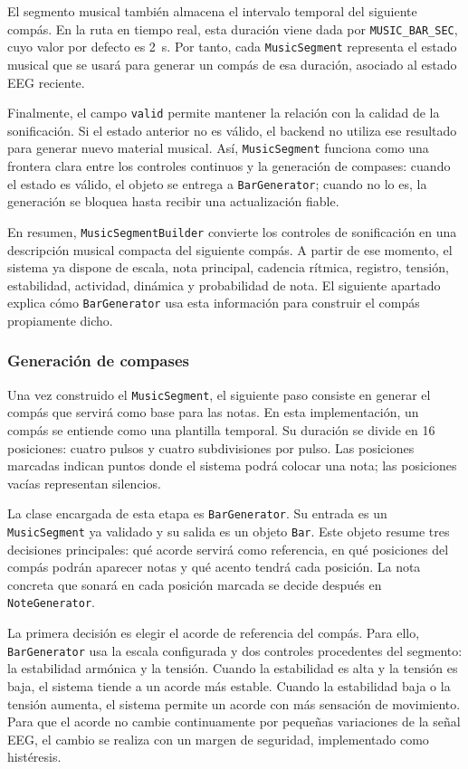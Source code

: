 \documentclass[../main.tex]{subfiles}
\begin{document}
El segmento musical también almacena el intervalo temporal del siguiente compás. En la ruta en tiempo real, esta duración viene dada por \texttt{MUSIC\_BAR\_SEC}, cuyo valor por defecto es \SI{2}{\second}. Por tanto, cada \texttt{MusicSegment} representa el estado musical que se usará para generar un compás de esa duración, asociado al estado EEG reciente.

Finalmente, el campo \texttt{valid} permite mantener la relación con la calidad de la sonificación. Si el estado anterior no es válido, el backend no utiliza ese resultado para generar nuevo material musical. Así, \texttt{MusicSegment} funciona como una frontera clara entre los controles continuos y la generación de compases: cuando el estado es válido, el objeto se entrega a \texttt{BarGenerator}; cuando no lo es, la generación se bloquea hasta recibir una actualización fiable.

En resumen, \texttt{MusicSegmentBuilder} convierte los controles de sonificación en una descripción musical compacta del siguiente compás. A partir de ese momento, el sistema ya dispone de escala, nota principal, cadencia rítmica, registro, tensión, estabilidad, actividad, dinámica y probabilidad de nota. El siguiente apartado explica cómo \texttt{BarGenerator} usa esta información para construir el compás propiamente dicho.

\subsubsection{Generación de compases}

Una vez construido el \texttt{MusicSegment}, el siguiente paso consiste en generar el compás que servirá como base para las notas. En esta implementación, un compás se entiende como una plantilla temporal. Su duración se divide en 16 posiciones: cuatro pulsos y cuatro subdivisiones por pulso. Las posiciones marcadas indican puntos donde el sistema podrá colocar una nota; las posiciones vacías representan silencios.

La clase encargada de esta etapa es \texttt{BarGenerator}. Su entrada es un \texttt{MusicSegment} ya validado y su salida es un objeto \texttt{Bar}. Este objeto resume tres decisiones principales: qué acorde servirá como referencia, en qué posiciones del compás podrán aparecer notas y qué acento tendrá cada posición. La nota concreta que sonará en cada posición marcada se decide después en \texttt{NoteGenerator}.

La primera decisión es elegir el acorde de referencia del compás. Para ello, \texttt{BarGenerator} usa la escala configurada y dos controles procedentes del segmento: la estabilidad armónica y la tensión. Cuando la estabilidad es alta y la tensión es baja, el sistema tiende a un acorde más estable. Cuando la estabilidad baja o la tensión aumenta, el sistema permite un acorde con más sensación de movimiento. Para que el acorde no cambie continuamente por pequeñas variaciones de la señal EEG, el cambio se realiza con un margen de seguridad, implementado como histéresis.
\end{document}
